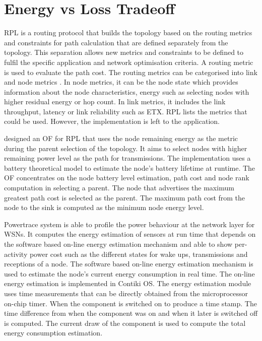 \chapter{Energy vs Loss Tradeoff}
\label{energyLoss}

RPL is a routing protocol that builds the topology based on the routing metrics and constraints for path calculation that are defined separately from the topology. This separation allows new metrics and constraints to be defined to fulfil the specific application and network optimisation criteria. A routing metric is used to evaluate the path cost. The routing metrics can be categorised into link and node metrics \cite{routingmetrics}. In node metrics, it can be the node state which provides information about the node characteristics, energy such as selecting nodes with higher residual energy or hop count. In link metrics, it includes the link throughput, latency or link reliability such as ETX. RPL lists the metrics that could be used. However, the implementation is left to the application. 

\cite{energyrpl} designed an OF for RPL that uses the node remaining energy as the metric during the parent selection of the topology. It aims to select nodes with higher remaining power level as the path for transmissions. The implementation uses a battery theoretical model \cite{sensornets13} to estimate the node's battery lifetime at runtime. The OF concentrates on the node battery level estimation, path cost and node rank computation in selecting a parent. The node that advertises the maximum greatest path cost is selected as the parent. The maximum path cost from the node to the sink is computed as the minimum node energy level. 

Powertrace system \cite{dunkels2011powertrace} is able to profile the power behaviour at the network layer for WSNs. It computes the energy estimation of sensors at run time that depends on the software based on-line energy estimation mechanism \cite{dunkels2007software} and able to show per-activity power cost such as the different states for wake ups, transmissions and receptions of a node.
The software based on-line energy estimation mechanism is used to estimate the node's current energy consumption in real time. The on-line energy estimation is implemented in Contiki OS. The energy estimation module uses time measurements that can be directly obtained from the microprocessor on-chip timer. When the component is switched on to produce a time stamp. The time difference from when the component was on and when it later is switched off is computed. The current draw of the component is used to compute the total energy consumption estimation.


